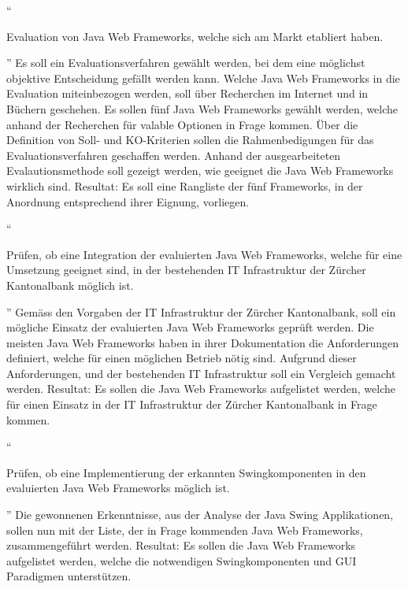   ``\begin{itshape}Evaluation von Java Web Frameworks, welche sich am Markt
  etabliert haben.\end{itshape}''
  \newline
  \newline
  \noindent
  Es soll ein Evaluationsverfahren gewählt werden, bei dem eine möglichst
  objektive Entscheidung gefällt werden kann. Welche Java Web Frameworks in die
  Evaluation miteinbezogen werden, soll über Recherchen im Internet und in
  Büchern geschehen. Es sollen fünf Java Web Frameworks gewählt werden, welche
  anhand der Recherchen für valable Optionen in Frage kommen. Über die
  Definition von Soll- und KO-Kriterien sollen die Rahmenbedigungen für das
  Evaluationsverfahren geschaffen werden. Anhand der ausgearbeiteten
  Evalautionsmethode soll gezeigt werden, wie geeignet die Java Web Frameworks
  wirklich sind.
  \newline
  \newline
  \noindent  
  Resultat: Es soll eine Rangliste der fünf Frameworks, in der Anordnung
  entsprechend ihrer Eignung, vorliegen.
  \newline

  ``\begin{itshape}Prüfen, ob eine Integration der evaluierten Java Web
  Frameworks, welche für eine Umsetzung geeignet sind, in der bestehenden IT
  Infrastruktur der Zürcher Kantonalbank möglich ist.\end{itshape}''
  \newline
  \newline
  \noindent
  Gemäss den Vorgaben der IT Infrastruktur der Zürcher Kantonalbank, soll ein
  mögliche Einsatz der evaluierten Java Web Frameworks geprüft werden. Die
  meisten Java Web Frameworks haben in ihrer Dokumentation die Anforderungen
  definiert, welche für einen möglichen Betrieb nötig sind. Aufgrund dieser
  Anforderungen, und der bestehenden IT Infrastruktur soll ein Vergleich gemacht
  werden.
  \newline
  \newline
  \noindent
  Resultat: Es sollen die Java Web Frameworks aufgelistet werden, welche für
  einen Einsatz in der IT Infrastruktur der Zürcher Kantonalbank in Frage kommen.
  \newline

  ``\begin{itshape}Prüfen, ob eine Implementierung der erkannten
  Swingkomponenten in den evaluierten Java Web Frameworks möglich
  ist.\end{itshape}''
  \newline
  \newline
  \noindent
  Die gewonnenen Erkenntnisse, aus der Analyse der Java Swing Applikationen,
  sollen nun mit der Liste, der in Frage kommenden Java Web Frameworks,
  zusammengeführt werden.
  \newline
  \newline
  \noindent
  Resultat: Es sollen die Java Web Frameworks aufgelistet werden, welche die
  notwendigen Swingkomponenten und GUI Paradigmen unterstützen.
  \newline

